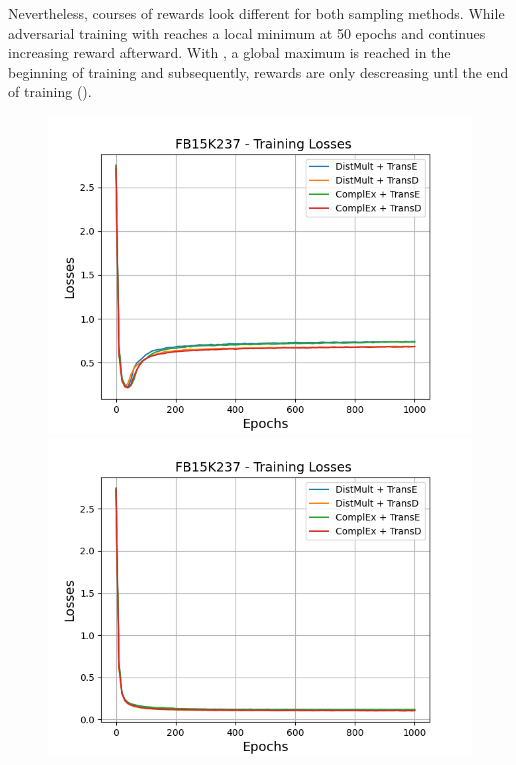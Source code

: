 Nevertheless, courses of rewards look different for both sampling methods.
While adversarial training with \origsampling reaches a local minimum at 50 epochs and continues increasing reward afterward.
With \ussoftmax, a global maximum is reached in the beginning of training and subsequently, rewards are only descreasing untl the end of training ().
\clearpage
\begin{figure}[H]
    \centering
    \begin{minipage}{.5\textwidth}
      \centering
      \includegraphics[width=0.9\linewidth]{figures/results/gan_train/not_pretrained/random/fb15k237/epochs1000/random_fb15k237_losses.png}
    \end{minipage}%
    \begin{minipage}{.5\textwidth}
      \centering
      \includegraphics[width=0.9\linewidth]{figures/results/gan_train/not_pretrained/uncertainty/max_distribution/entropy/fb15k237/1k_epochs/uncertainty_fb15k237_losses.png}

\end{minipage}
\end{figure}

